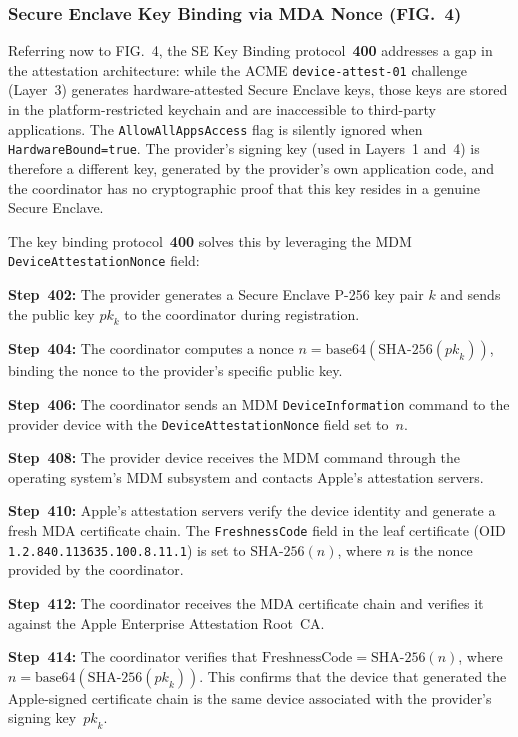 \documentclass[11pt,letterpaper]{article}
\begin{document}
\subsubsection{Secure Enclave Key Binding via MDA Nonce (FIG.~4)}

Referring now to FIG.~4, the SE Key Binding protocol~\textbf{400} addresses a gap in the attestation architecture: while the ACME \texttt{device-attest-01} challenge (Layer~3) generates hardware-attested Secure Enclave keys, those keys are stored in the platform-restricted keychain and are inaccessible to third-party applications. The \texttt{AllowAllAppsAccess} flag is silently ignored when \texttt{HardwareBound=true}. The provider's signing key (used in Layers~1 and~4) is therefore a different key, generated by the provider's own application code, and the coordinator has no cryptographic proof that this key resides in a genuine Secure Enclave.

The key binding protocol~\textbf{400} solves this by leveraging the MDM \texttt{DeviceAttestationNonce} field:

\textbf{Step~402:} The provider generates a Secure Enclave P-256 key pair $k$ and sends the public key $\mathit{pk}_k$ to the coordinator during registration.

\textbf{Step~404:} The coordinator computes a nonce $n = \mathrm{base64}(\mathrm{SHA\text{-}256}(\mathit{pk}_k))$, binding the nonce to the provider's specific public key.

\textbf{Step~406:} The coordinator sends an MDM \texttt{DeviceInformation} command to the provider device with the \texttt{DeviceAttestationNonce} field set to~$n$.

\textbf{Step~408:} The provider device receives the MDM command through the operating system's MDM subsystem and contacts Apple's attestation servers.

\textbf{Step~410:} Apple's attestation servers verify the device identity and generate a fresh MDA certificate chain. The \texttt{FreshnessCode} field in the leaf certificate (OID \texttt{1.2.840.113635.100.8.11.1}) is set to $\mathrm{SHA\text{-}256}(n)$, where $n$ is the nonce provided by the coordinator.

\textbf{Step~412:} The coordinator receives the MDA certificate chain and verifies it against the Apple Enterprise Attestation Root~CA.

\textbf{Step~414:} The coordinator verifies that $\mathrm{FreshnessCode} = \mathrm{SHA\text{-}256}(n)$, where $n = \mathrm{base64}(\mathrm{SHA\text{-}256}(\mathit{pk}_k))$. This confirms that the device that generated the Apple-signed certificate chain is the same device associated with the provider's signing key~$\mathit{pk}_k$.
\end{document}
